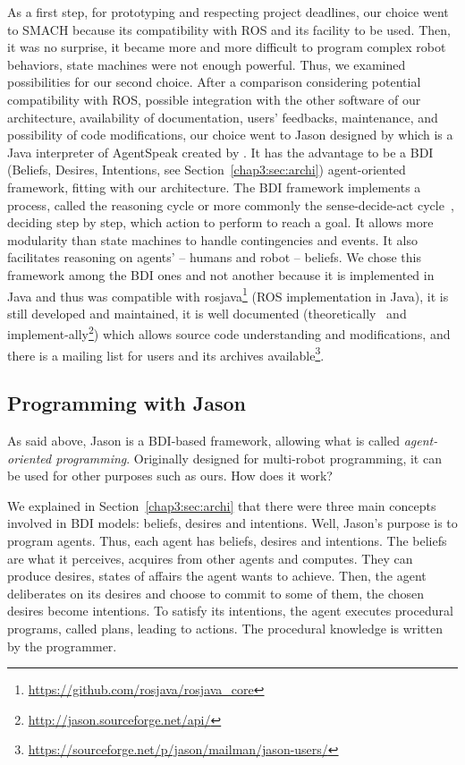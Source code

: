\documentclass[a4paper,11pt,twoside]{StyleThese}
\begin{document}
As a first step, for prototyping and respecting project deadlines, our choice went to SMACH because its compatibility with ROS and its facility to be used. Then, it was no surprise, it became more and more difficult to program complex robot behaviors, state machines were not enough powerful. Thus, we examined possibilities for our second choice. After a comparison considering potential compatibility with ROS, possible integration with the other software of our architecture, availability of documentation, users' feedbacks, maintenance, and possibility of code modifications, our choice went to Jason designed by \cite{bordini_2007_jason} which is a Java interpreter of AgentSpeak created by \cite{rao_1996_agentspeak}. It has the advantage to be a BDI (Beliefs, Desires, Intentions, see Section~\ref{chap3:sec:archi}) agent-oriented framework, fitting with our architecture. The BDI framework implements a process, called the reasoning cycle or more commonly the sense-decide-act cycle~\citep{albus_1991_outline}, deciding step by step, which action to perform to reach a goal. It allows more modularity than state machines to handle contingencies and events. It also facilitates reasoning on agents' -- humans and robot -- beliefs. We chose this framework among the BDI ones and not another because it is implemented in Java and thus was compatible with rosjava\footnote{\url{https://github.com/rosjava/rosjava_core}} (\ie ROS implementation in Java), it is still developed and maintained, it is well documented (theoretically~\citep{bordini_2007_jason} and implement-ally\footnote{\url{http://jason.sourceforge.net/api/}}) which allows source code understanding and modifications, and there is a mailing list for users and its archives available\footnote{\url{https://sourceforge.net/p/jason/mailman/jason-users/}}.

\subsection{Programming with Jason}\label{chap4:subsec:jason}
As said above, Jason is a BDI-based framework, allowing what is called \textit{agent-oriented programming}. Originally designed for multi-robot programming, it can be used for other purposes such as ours. How does it work?

We explained in Section~\ref{chap3:sec:archi} that there were three main concepts involved in BDI models: beliefs, desires and intentions. Well, Jason's purpose is to program agents. Thus, each agent has beliefs, desires and intentions. The beliefs are what it perceives, acquires from other agents and computes. They can produce desires, \ie states of affairs the agent wants to achieve. Then, the agent deliberates on its desires and choose to commit to some of them, \ie the chosen desires become intentions. To satisfy its intentions, the agent executes procedural programs, called plans, leading to actions. The procedural knowledge is written by the programmer.
\end{document}
